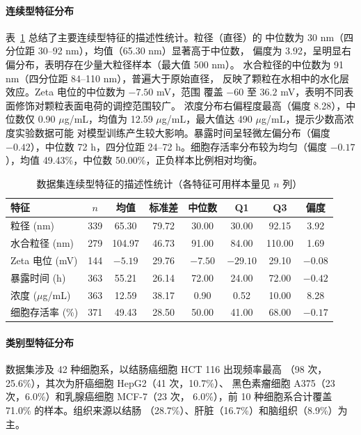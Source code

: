 \paragraph{连续型特征分布}
表~\ref{tab:statistics} 总结了主要连续型特征的描述性统计。粒径（直径）的
中位数为 30 nm（四分位距 30--92 nm），均值（65.30 nm）显著高于中位数，
偏度为 3.92，呈明显右偏分布，表明存在少量大粒径样本（最大值 500 nm）。
水合粒径的中位数为 91 nm（四分位距 84--110 nm），普遍大于原始直径，
反映了颗粒在水相中的水化层效应。Zeta 电位的中位数为 $-7.50$ mV，范围
覆盖 $-60$ 至 $36.2$ mV，表明不同表面修饰对颗粒表面电荷的调控范围较广。
浓度分布右偏程度最高（偏度 8.28），中位数仅 0.90 $\mu$g/mL，均值为
12.59 $\mu$g/mL，最大值达 490 $\mu$g/mL，提示少数高浓度实验数据可能
对模型训练产生较大影响。暴露时间呈轻微左偏分布（偏度 $-0.42$），中位数
72 h，四分位距 24--72 h。细胞存活率分布较为均匀（偏度 $-0.17$），均值
49.43\%，中位数 50.00\%，正负样本比例相对均衡。

\begin{table}[htbp]
  \centering
  \caption{数据集连续型特征的描述性统计（各特征可用样本量见 $n$ 列）}
  \label{tab:statistics}
  \begin{tabular}{lccccccc}
    \hline
    特征 & $n$ & 均值 & 标准差 & 中位数 & Q1 & Q3 & 偏度 \\
    \hline
    粒径 (nm)            & 339 & 65.30  & 79.72  & 30.00  & 30.00  & 92.15   & 3.92  \\
    水合粒径 (nm)        & 279 & 104.97 & 46.73  & 91.00  & 84.00  & 110.00  & 1.69  \\
    Zeta 电位 (mV)       & 144 & $-5.19$ & 29.76  & $-7.50$ & $-29.10$ & 29.10 & $-0.08$ \\
    暴露时间 (h)         & 363 & 55.21  & 26.14  & 72.00  & 24.00  & 72.00   & $-0.42$ \\
    浓度 ($\mu$g/mL)     & 363 & 12.59  & 38.17  & 0.90   & 0.52   & 10.00   & 8.28  \\
    细胞存活率 (\%)      & 371 & 49.43  & 28.50  & 50.00  & 41.00  & 68.00   & $-0.17$ \\
    \hline
  \end{tabular}
\end{table}

\paragraph{类别型特征分布}
数据集涉及 42 种细胞系，以结肠癌细胞 HCT 116 出现频率最高
（98 次，25.6\%），其次为肝癌细胞 HepG2（41 次，10.7\%）、
黑色素瘤细胞 A375（23 次，6.0\%）和乳腺癌细胞 MCF-7（23 次，
6.0\%），前 10 种细胞系合计覆盖 71.0\% 的样本。组织来源以结肠
（28.7\%）、肝脏（16.7\%）和脑组织（8.9\%）为主。


